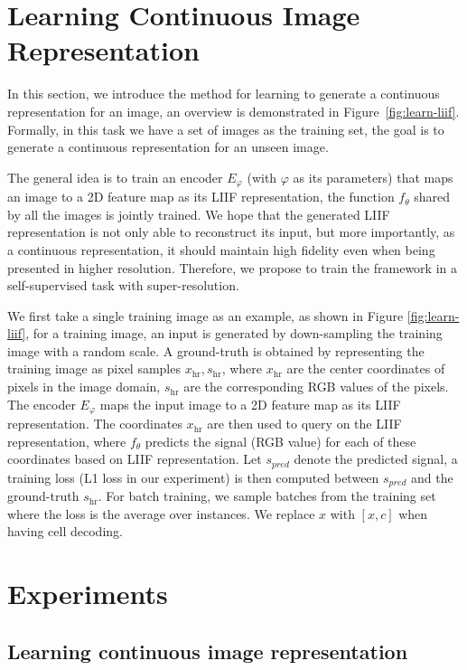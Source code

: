 \documentclass[final]{cvpr}
\begin{document}
\section{Learning Continuous Image Representation}

In this section, we introduce the method for learning to generate a continuous representation for an image, an overview is demonstrated in Figure~\ref{fig:learn-liif}. Formally, in this task we have a set of images as the training set, the goal is to generate a continuous representation for an unseen image.

The general idea is to train an encoder $E_{\varphi}$ (with $\varphi$ as its parameters) that maps an image to a 2D feature map as its LIIF representation, the function $f_{\theta}$ shared by all the images is jointly trained. We hope that the generated LIIF representation is not only able to reconstruct its input, but more importantly, as a continuous representation, it should maintain high fidelity even when being presented in higher resolution. Therefore, we propose to train the framework in a self-supervised task with super-resolution.

We first take a single training image as an example, as shown in Figure \ref{fig:learn-liif}, for a training image, an input is generated by down-sampling the training image with a random scale. A ground-truth is obtained by representing the training image as pixel samples $x_{\textrm{hr}},s_{\textrm{hr}}$, where $x_{\textrm{hr}}$ are the center coordinates of pixels in the image domain, $s_{\textrm{hr}}$ are the corresponding RGB values of the pixels. The encoder $E_{\varphi}$ maps the input image to a 2D feature map as its LIIF representation. The coordinates $x_{\textrm{hr}}$ are then used to query on the LIIF representation, where $f_{\theta}$ predicts the signal (RGB value) for each of these coordinates based on LIIF representation. Let $s_{pred}$ denote the predicted signal, a training loss (L1 loss in our experiment) is then computed between $s_{pred}$ and the ground-truth $s_{\textrm{hr}}$. For batch training, we sample batches from the training set where the loss is the average over instances. We replace $x$ with $[x, c]$ when having cell decoding.

\section{Experiments}

\subsection{Learning continuous image representation}
\end{document}
